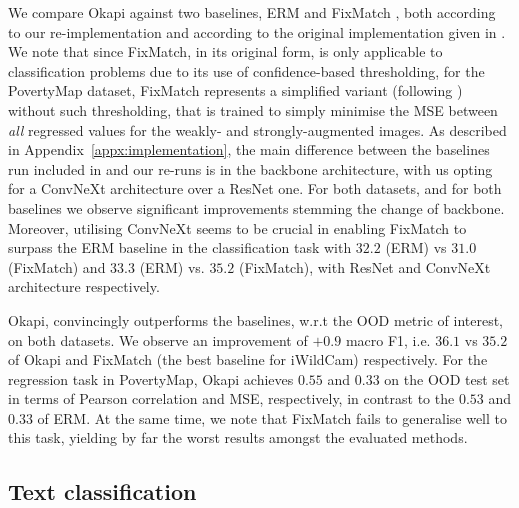 We compare Okapi against two baselines, \ac{ERM} and FixMatch \citep{sohn2020fixmatch},
both according to our re-implementation and according to the original implementation given in
\cite{SagWeiLeeGaoetal22}.
%
We note that since FixMatch, in its original form, is only applicable to classification problems
due to its use of confidence-based thresholding, for the PovertyMap dataset, FixMatch represents a
simplified variant (following \citep{SagWeiLeeGaoetal22}) without such thresholding, that is
trained to simply minimise the MSE between \emph{all} regressed values for the weakly- and
strongly-augmented images.
%
As described in Appendix~\ref{appx:implementation}, the main difference between the baselines run
included in \cite{SagWeiLeeGaoetal22} and our re-runs is in the backbone architecture, with us
opting for a ConvNeXt  \citep{liu2022convnet} architecture over a ResNet one.
%
For both datasets, and for both baselines we observe significant improvements stemming the change
of backbone.
%
%
Moreover, utilising ConvNeXt seems to be crucial in enabling FixMatch to surpass the \ac{ERM} baseline
in the classification task with $32.2$ (ERM) vs $31.0$ (FixMatch) and $33.3$ (ERM) vs. $35.2$
(FixMatch), with ResNet and ConvNeXt architecture respectively. 
% 

Okapi, convincingly outperforms the baselines, w.r.t the OOD metric of interest, on both datasets. 
%
We observe an improvement of $+0.9$ macro F1, i.e. $36.1$ vs $35.2$ of Okapi and FixMatch (the best
baseline for iWildCam) respectively. For the regression task in PovertyMap, Okapi achieves $0.55$
and $0.33$ on the OOD test set in terms of Pearson correlation and MSE, respectively, in contrast
to the $0.53$ and $0.33$ of \ac{ERM}.
%
At the same time, we note that FixMatch fails to generalise well to this task, yielding by far the
worst results amongst the evaluated methods.

\subsection{Text classification}

